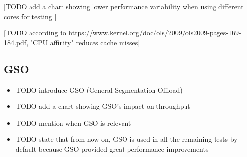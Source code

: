 \documentclass[12pt,a4paper,twoside,openright]{report}
\begin{document}
[TODO add a chart showing lower performance variability when using different cores for testing ]

[TODO according to https://www.kernel.org/doc/ols/2009/ols2009-pages-169-184.pdf, "CPU affinity" reduces cache misses]

\subsection{GSO}
\begin{itemize}
  \item TODO introduce GSO (General Segmentation Offload)
  
  
  \item TODO add a chart showing GSO's impact on throughput
  
  
  \item TODO mention when GSO is relevant
  
  \item TODO state that from now on, GSO is used in all the remaining tests by default because GSO provided great performance improvements
\end{itemize}
\end{document}
